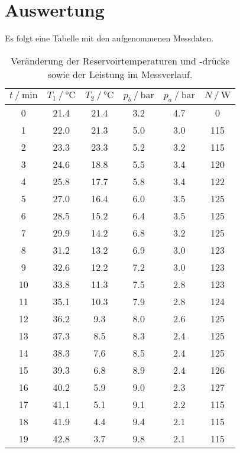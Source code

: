 \section{Auswertung}
\label{sec:Auswertung}

Es folgt eine Tabelle mit den aufgenommenen Messdaten.
\begin{table}[H]
  \centering
  \caption{Veränderung der Reservoirtemperaturen und -drücke sowie der Leistung im Messverlauf.}
  \label{tab:freiePendel}
  \begin{tabular}{S[table-format=2.0] S S S S S[table-format=3.0]}
    \toprule
    {$t \mathbin{/} \unit{\minute}$} 
    & {$T_1 \mathbin{/} \unit{\celsius}$} & {$T_2 \mathbin{/} \unit{\celsius}$} 
    & {$p_b \mathbin{/} \unit{\bar}$} & {$p_a \mathbin{/} \unit{\bar}$} 
    & {$N \mathbin{/} \unit{\watt}$} \\
     & 21.4 & 21.4 &  3.2 & 4.7 &   0 \\
     1 & 22.0 & 21.3 &  5.0 & 3.0 & 115 \\
     2 & 23.3 & 23.3 &  5.2 & 3.2 & 115 \\
     3 & 24.6 & 18.8 &  5.5 & 3.4 & 120 \\
     4 & 25.8 & 17.7 &  5.8 & 3.4 & 122 \\
     5 & 27.0 & 16.4 &  6.0 & 3.5 & 125 \\
     6 & 28.5 & 15.2 &  6.4 & 3.5 & 125 \\
     7 & 29.9 & 14.2 &  6.8 & 3.2 & 125 \\
     8 & 31.2 & 13.2 &  6.9 & 3.0 & 123 \\
     9 & 32.6 & 12.2 &  7.2 & 3.0 & 123 \\
    10 & 33.8 & 11.3 &  7.5 & 2.8 & 123 \\
    11 & 35.1 & 10.3 &  7.9 & 2.8 & 124 \\
    12 & 36.2 &  9.3 &  8.0 & 2.6 & 125 \\
    13 & 37.3 &  8.5 &  8.3 & 2.4 & 125 \\
    14 & 38.3 &  7.6 &  8.5 & 2.4 & 125 \\
    15 & 39.3 &  6.8 &  8.9 & 2.4 & 126 \\
    16 & 40.2 &  5.9 &  9.0 & 2.3 & 127 \\
    17 & 41.1 &  5.1 &  9.1 & 2.2 & 115 \\
    18 & 41.9 &  4.4 &  9.4 & 2.1 & 115 \\
    19 & 42.8 &  3.7 &  9.8 & 2.1 & 115 \\

\end{tabular}
\end{table}
